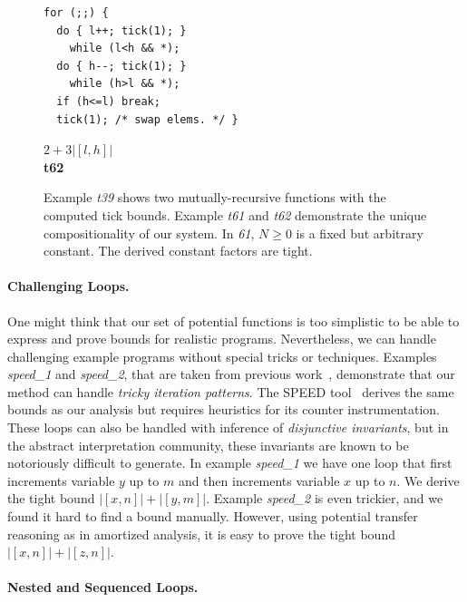 \documentclass[nocopyrightspace,preprint,pldi]{sigplanconf-pldi15}
\newcommand{\ifshort}[2]{\ifx\fullversion\undefined{#1}\else{#2}\fi}
\newcommand{\paraskip}[0]{\ifshort{\vspace{-2pt}}{}}
\begin{document}
\begin{figure}
\begin{minipage}[b]{5.5cm}
\begin{center}
\begin{lstlisting}
   \end{lstlisting}
\vspace{-2.5ex}
\begin{lstlisting}
for (;;) {
  do { l++; tick(1); }
    while (l<h && *);
  do { h--; tick(1); }
    while (h>l && *);
  if (h<=l) break;
  tick(1); /* swap elems. */ }
\end{lstlisting}
$2+3|[l,h]|$
\\[.4\baselineskip]
      {\bf t62}
    \end{center}
  \end{minipage}
\vspace{1ex}
\caption{Example \emph{t39} shows two mutually-recursive functions
  with the computed tick bounds.  Example \emph{t61} and \emph{t62}
  demonstrate the unique compositionality of our system. In \emph{61},
  $N\geq 0$ is a fixed but arbitrary constant.  The derived constant factors
  are tight.}
  \label{fig:ex_list_2}
\end{figure}



\paraskip
\paragraph{Challenging Loops.}

One might think that our set of potential functions is too simplistic
to be able to express and prove bounds for realistic
programs. Nevertheless, we can handle challenging example programs
without special tricks or techniques.  Examples \emph{speed\_1} and
\emph{speed\_2}, that are taken from previous work~\cite{GulwaniMC09},
demonstrate that our method can handle \emph{tricky iteration
  patterns}.  The SPEED tool~\cite{GulwaniMC09} derives the same
bounds as our analysis but requires heuristics for its counter
instrumentation.  These loops can also be handled with inference of
\emph{disjunctive invariants}, but in the abstract interpretation
community, these invariants are known to be notoriously difficult to
generate.
%
In example \emph{speed\_1} we have one loop that first increments
variable $y$ up to $m$ and then increments variable $x$ up to $n$.  We
derive the tight bound $|[x, n]| + |[y, m]|$.
%
Example \emph{speed\_2} is even trickier, and we found it hard to
find a bound manually.  However, using potential transfer reasoning as
in amortized analysis, it is easy to prove the tight bound
$|[x, n]| + |[z, n]|$.

\paraskip
\paragraph{Nested and Sequenced Loops.}
\end{document}

